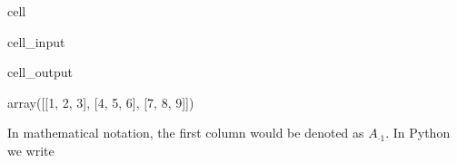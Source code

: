 \documentclass[letterpaper,10pt,english]{jupyterBook}
\begin{document}
\begin{sphinxuseclass}{cell}\begin{sphinxVerbatimInput}

\begin{sphinxuseclass}{cell_input}
\begin{sphinxVerbatim}[commandchars=\\\{\}]
   
\PYG{p}{[}\PYG{p}{[}\PYG{p}{]}\PYG{p}{[}\PYG{p}{]}\PYG{p}{[}\PYG{p}{]}\PYG{p}{]}
\end{sphinxVerbatim}

\end{sphinxuseclass}\end{sphinxVerbatimInput}
\begin{sphinxVerbatimOutput}

\begin{sphinxuseclass}{cell_output}
\begin{sphinxVerbatim}[commandchars=\\\{\}]
array([[1, 2, 3],
       [4, 5, 6],
       [7, 8, 9]])
\end{sphinxVerbatim}

\end{sphinxuseclass}\end{sphinxVerbatimOutput}

\end{sphinxuseclass}
\sphinxAtStartPar
In mathematical notation, the first column would be denoted as \(A_{\cdot 1}\). In Python we write
\end{document}
